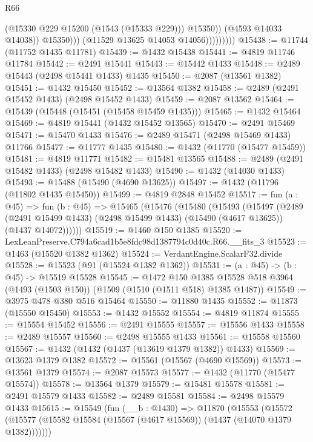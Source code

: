 \begin{lexlean}{R66}
\begin{coremodule}
                                (@15330 @229 @15200 (@1543 (@15333 @229)))
                                @15350))
                            (@4593 @14033 @14038))
                          @15350)))
                    (@11529 @13625 @14053 @14056)))))))))
@15438 := @11744 (@11752 @1435 @11781)
@15439 := @1432 @15438
@15441 := @4819 @11746 @11784
@15442 := @2491 @15441
@15443 := @15442 @1433
@15448 := @2489 @15443 (@2498 @15441 @1433) @1435
@15450 := @2087 (@13561 @1382)
@15451 := @1432 @15450
@15452 := @13564 @1382
@15458 := @2489 (@2491 @15452 @1433) (@2498 @15452 @1433)
@15459 := @2087 @13562
@15464 := @15439 (@15448 (@15451 (@15458 @15459 @1435)))
@15465 := @1432 @15464
@15469 := @4819 @15441 (@1432 @15452 @13565)
@15470 := @2491 @15469
@15471 := @15470 @1433
@15476 := @2489 @15471 (@2498 @15469 @1433) @11766
@15477 := @11777 @1435
@15480 := @1432 (@11770 (@15477 @15459))
@15481 := @4819 @11771
@15482 := @15481 @13565
@15488 := @2489 (@2491 @15482 @1433) (@2498 @15482 @1433)
@15490 := @1432 (@14030 @1433)
@15493 := @15488 (@15490 (@4690 @13625))
@15497 := @1432 (@11796 (@11802 @1435 @15450))
@15499 := @4819 @2848 @15452
@15517 := fun (a : @45) =>
  fun (b : @45) =>
  @15465
    (@15476
      (@15480
        (@15493
          (@15497
            (@2489
              (@2491 @15499 @1433)
              (@2498 @15499 @1433)
              (@15490 (@4617 @13625))
              (@1437 @14072))))))
@15519 := @1460 @150 @1385
@15520 := LexLeanPreserve.C794a6cad1b5e8fdc98d1387794c0d40c.R66.__fits_3
@15523 := @1463 (@15520 @1382 @1362)
@15524 := VerdantEngine.ScalarF32.divide
@15528 := @15523 (@91 (@15524 @1382 @1362))
@15531 := (a : @45) -> (b : @45) -> @15519 @15528
@15545 := @1472
    @150
    @1385
    @15528
    @518
    @3964
    (@1493 (@1503 @150))
    (@1509 (@1510 (@1511 @518) @1385 @1487))
@15549 := @3975 @478 @380 @516 @15464
@15550 := @11880 @1435
@15552 := @11873 (@15550 @15450)
@15553 := @1432 @15552
@15554 := @4819 @11874
@15555 := @15554 @15452
@15556 := @2491 @15555
@15557 := @15556 @1433
@15558 := @2489 @15557
@15560 := @2498 @15555 @1433
@15561 := @15558 @15560
@15567 := @1432 (@1432 (@1437 (@13619 @1379 @1382)) @1433)
@15569 := @13623 @1379 @1382
@15572 := @15561 (@15567 (@4690 @15569))
@15573 := @13561 @1379
@15574 := @2087 @15573
@15577 := @1432 (@11770 (@15477 @15574))
@15578 := @13564 @1379
@15579 := @15481 @15578
@15581 := @2491 @15579 @1433
@15582 := @2489 @15581
@15584 := @2498 @15579 @1433
@15615 := @15549
    (fun (__b : @1430) =>
    @11870
      (@15553
        (@15572 (@15577 (@15582 @15584 (@15567 (@4617 @15569)) (@1437 (@14070 @1379 @1382)))))))

\end{coremodule}
\end{lexlean}
